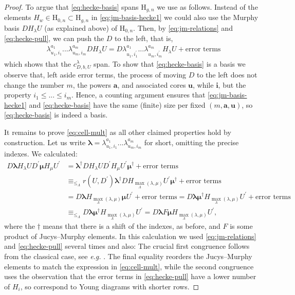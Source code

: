 \documentclass[a4paper,11pt]{amsart}
\newcommand{\eg}{\textsl{e.g.}}
\renewcommand{\dots}{\text{...}}
\newcommand{\setstuff}[1]{\mathrm{#1}}
\newcommand{\bsym}[1]{\boldsymbol{#1}}
\numberwithin{equation}{section}
\begin{document}
\begin{proof}
To argue that \eqref{eq:hecke-basis} spans
$\setstuff{H}_{g,n}$ we use \cite[Proposition 3.16]{Ma-hecke-schur} as follows.
Instead of the elements $H_{w}\in\setstuff{H}_{0,n}\subset
\setstuff{H}_{g,n}$ in \eqref{eq:jm-basis-hecke1} we could 
also use the Murphy basis $DH_{\lambda}U$ (as explained above) of $\setstuff{H}_{0,n}$. Then, by 
\eqref{eq:jm-relations} and \eqref{eq:hecke-pull}, we can push 
the $D$ to the left, that is, 
\begin{gather*}
\lambda_{u_{1}^{},i_{1}}^{a_{1}}\dots 
\lambda_{u_{m},i_{m}}^{a_{m}}DH_{\lambda}U
=D\lambda_{u_{1},i_{1}^{\prime}}^{a_{1}}\dots 
\lambda_{u_{m},i_{m}^{\prime}}^{a_{m}}H_{\lambda}U+\text{error terms}
\end{gather*} 
which shows that the $c_{D,b,U}^{\lambda}$ span.
To show that \eqref{eq:hecke-basis} is a basis we observe that,
left aside error terms, the process of moving $D$ to the left 
does not change the number $m$, 
the powers $\bsym{a}$, and associated cores $\bsym{u}$, while 
$\bsym{i}$, but the property $i_{1}\leq\dots\leq i_{m}$. Hence, 
a counting argument ensures that \eqref{eq:jm-basis-hecke1} and 
\eqref{eq:hecke-basis} have the same (finite) size per fixed 
$(m,\bsym{a},\bsym{u})$, 
so \eqref{eq:hecke-basis} is indeed a basis.

It remains to prove \eqref{eq:cell-mult} as all other claimed 
properties hold by construction. Let us write 
$\bsym{\lambda}=\lambda_{u_{1},i_{1}}^{a_{1}}\dots 
\lambda_{u_{m},i_{m}}^{a_{m}}$ for short, omitting the precise indexes.
We calculated: 
\begin{align*}
D\bsym{\lambda}H_{\lambda}U
D^{\prime}\bsym{\mu}H_{\mu}U^{\prime}
&=
\bsym{\lambda}^{\dagger}DH_{\lambda}U
D^{\prime}H_{\mu}U^{\prime}\bsym{\mu}^{\dagger}
+\text{error terms}
\\
&\equiv_{\leq_{\Lambda}}
r(U,D^{\prime})
\bsym{\lambda}^{\dagger}DH_{\max_{\Lambda}(\lambda,\mu)}
U^{\prime}\bsym{\mu}^{\dagger}
+\text{error terms}
\\
&=
D\bsym{\lambda}H_{\max_{\Lambda}(\lambda,\mu)}
\bsym{\mu}U^{\prime}
+\text{error terms}
=
D\bsym{\lambda}
\bsym{\mu}^{\dagger}H_{\max_{\Lambda}(\lambda,\mu)}U^{\prime}
+\text{error terms}
\\
&\equiv_{\leq_{\Lambda}}
D\bsym{\lambda}
\bsym{\mu}^{\dagger}H_{\max_{\Lambda}(\lambda,\mu)}U^{\prime}
=
D\bsym{\lambda}
F\bsym{\mu}H_{\max_{\Lambda}(\lambda,\mu)}U^{\prime}
,
\end{align*}
where the $\dagger$ means that there is 
a shift of the indexes, as before, and $F$ 
is some product of Jucys--Murphy elements. 
In this calculation we used 
\eqref{eq:jm-relations} 
and \eqref{eq:hecke-pull} several times and also:
The crucial first congruence 
follows from the classical case, see {\eg} \cite[Theorem 3.20]{Ma-hecke-schur}.
The final equality reorders the 
Jucys--Murphy elements to match the expression in 
\eqref{eq:cell-mult}, while the second congruence uses 
the observation that the error terms in \eqref{eq:hecke-pull} 
have a lower number of $H_{i}$, so correspond to Young diagrams with shorter rows.
\end{proof} 
\end{document}
